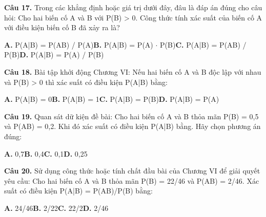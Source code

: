 \documentclass[11pt,a4paper]{article}
\begin{document}
\textbf{\color{primary} Câu 17.} Trong các khẳng định hoặc giá trị dưới đây, đâu là đáp án đúng cho câu hỏi: Cho hai biến cố A và B với P(B) > 0. Công thức tính xác suất của biến cố A với điều kiện biến cố B đã xảy ra là?\par
\hspace*{1.5em}\textbf{A.} P(A|B) = P(AB) / P(A)\quad\quad \textbf{B.} P(A|B) = P(A) $\cdot$ P(B)\quad\quad \textbf{C.} P(A|B) = P(AB) / P(B)\quad\quad \textbf{D.} P(A|B) = P(A) / P(B)\par\vspace{2pt}
\textbf{\color{primary} Câu 18.} Bài tập khởi động Chương VI: Nếu hai biến cố A và B độc lập với nhau và P(B) > 0 thì xác suất có điều kiện P(A|B) bằng:\par
\hspace*{1.5em}\textbf{A.} P(A|B) = 0\quad\quad \textbf{B.} P(A|B) = 1\quad\quad \textbf{C.} P(A|B) = P(B)\quad\quad \textbf{D.} P(A|B) = P(A)\par\vspace{2pt}
\textbf{\color{primary} Câu 19.} Quan sát dữ kiện đề bài: Cho hai biến cố A và B thỏa mãn P(B) = 0,5 và P(AB) = 0,2. Khi đó xác suất có điều kiện P(A|B) bằng. Hãy chọn phương án đúng:\par
\hspace*{1.5em}\textbf{A.} 0,7\quad\quad \textbf{B.} 0,4\quad\quad \textbf{C.} 0,1\quad\quad \textbf{D.} 0,25\par\vspace{2pt}
\textbf{\color{primary} Câu 20.} Sử dụng công thức hoặc tính chất đầu bài của Chương VI để giải quyết yêu cầu: Cho hai biến cố A và B thỏa mãn P(B) = 22/46 và P(AB) = 2/46. Xác suất có điều kiện P(A|B) = P(AB)/P(B) bằng:\par
\hspace*{1.5em}\textbf{A.} 24/46\quad\quad \textbf{B.} 2/22\quad\quad \textbf{C.} 22/2\quad\quad \textbf{D.} 2/46\par\vspace{2pt}
\end{document}
